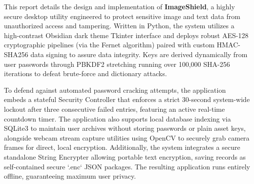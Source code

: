\documentclass[12pt,a4paper]{report}
\renewcommand{\headrulewidth}{0pt}
\renewcommand{\footrulewidth}{0pt}
\begin{document}
\noindent This report details the design and implementation of \textbf{ImageShield}, a highly secure desktop utility engineered to protect sensitive image and text data from unauthorized access and tampering. Written in Python, the system utilizes a high-contrast Obsidian dark theme Tkinter interface and deploys robust AES-128 cryptographic pipelines (via the Fernet algorithm) paired with custom HMAC-SHA256 data signing to assure data integrity. Keys are derived dynamically from user passwords through PBKDF2 stretching running over 100,000 SHA-256 iterations to defeat brute-force and dictionary attacks. \par
\noindent To defend against automated password cracking attempts, the application embeds a stateful Security Controller that enforces a strict 30-second system-wide lockout after three consecutive failed entries, featuring an active real-time countdown timer. The application also supports local database indexing via SQLite3 to maintain user archives without storing passwords or plain asset keys, alongside webcam stream capture utilities using OpenCV to securely grab camera frames for direct, local encryption. Additionally, the system integrates a secure standalone String Encrypter allowing portable text encryption, saving records as self-contained secure `.enc` JSON packages. The resulting application runs entirely offline, guaranteeing maximum user privacy.



\newpage
\tableofcontents
\newpage
\listoftables
\newpage
\listoffigures

\newpage
{}
\setcounter{page}{1}

\pagestyle{fancy}
\fancyhf{}
\fancyfoot[R]{\fontsize{10}{12}\selectfont \thepage} %
\renewcommand{\headrulewidth}{0.4pt}
\renewcommand{\footrulewidth}{0.4pt}

\fancypagestyle{plain}{
  \fancyhf{}
  \fancyfoot[R]{\fontsize{10}{12}\selectfont \thepage}
  \fancyfoot[L]{\fontsize{10}{12}\selectfont Dept. of CSE-Allied, MVSREC(A)}
  \renewcommand{\headrulewidth}{0pt}
  \renewcommand{\footrulewidth}{0.4pt}
}
\end{document}
